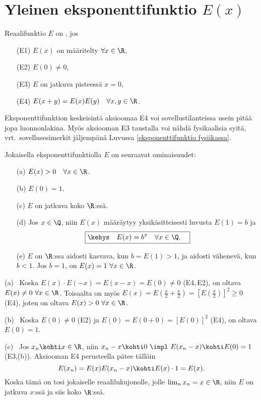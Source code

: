 \section{Yleinen eksponenttifunktio $E(x)$} \label{yleinen eksponenttifunktio}
\alku

\begin{Def} \label{reaalinen E(x)} 
Reaalifunktio $E$ on , jos
\begin{itemize}
\item[(E1)] $E(x)$ on määritelty $\forall x\in\R$,
\item[(E2)] $E(0)\neq 0$,
\item[(E3)] $E$ on jatkuva pisteessä $x=0$,
\item[(E4)] $E(x+y)=E(x)E(y)\quad\forall x,y\in\R$.
\end{itemize}
\end{Def}
Eksponenttifunktion keskeisintä aksioomaa E4 voi sovellustilanteissa usein pitää 
jopa luonnonlakina. Myös aksiooman E3 taustalla voi nähdä fysikaalisia syitä,
vrt.\ sovellusesimerkit jäljempänä Luvussa \ref{eksponenttifunktio fysiikassa}.
\begin{Lause} \label{eksponenttifunktion ominaisuudet}
Jokaisella eksponenttifunktiolla $E$ on seuraavat ominaisuudet:
\begin{itemize}
\item[(a)] $E(x)>0\quad\forall x\in\R$.
\item[(b)] $E(0)=1$.
\item[(c)] $E$ on jatkuva koko $\R$:ssä.
\item[(d)] Jos $x\in\Q$, niin $E(x)$ määräytyy yksikäsitteisesti luvusta $E(1)=b$ ja
\[
\boxed{\kehys\quad E(x)=b^x\quad\forall x\in\Q. \quad}
\]
\item[(e)] $E$ on $\R$:ssa aidosti kasvava, kun $b=E(1)>1$, ja aidosti vähenevä, kun $b<1$.
           Jos $b=1$, on $E(x)=1\ \forall x\in\R$.
\end{itemize}
\end{Lause}
\tod (a) \ Koska $E(x)\cdot E(-x)=E(x-x)=E(0)\neq 0$ (E4,\,E2), on oltava 
$E(x)\neq 0 \ \forall x\in\R$. Toisaalta on myös
$E(x)=E(\tfrac{x}{2}+\tfrac{x}{2})=[E(\tfrac{x}{2})]^2 \ge 0$ (E4), joten on oltava
$E(x)>0 \ \forall x\in\R$.

(b) \ Koska $E(0)\neq 0$ (E2) ja $E(0)=E(0+0)=[E(0)]^2$ (E4), on oltava $E(0)=1$.

(c) \ Jos $x_n \kohti x\in\R$, niin $x_n-x \kohti 0\ \impl\ E(x_n-x) \kohti E(0)=1$
(E3,(b)). Aksiooman E4 perusteella pätee tällöin 
\[
E(x_n) = E(x)E(x_n-x) \kohti E(x)\cdot 1 = E(x).
\]
Koska tämä on tosi jokaiselle reaalilukujonolle, jolle $\lim_n x_n=x\in\R$, niin $E$ on
jatkuva $x$:ssä ja siis koko $\R$:ssä.

